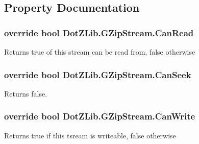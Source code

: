 \subsection{Property Documentation}
\hypertarget{class_dot_z_lib_1_1_g_zip_stream_a3536d9e36bb8811093a13ba973c61cd8}{
\subsubsection[{Can\+Read}]{\setlength{\rightskip}{0pt plus 5cm}override bool Dot\+Z\+Lib.\+G\+Zip\+Stream.\+Can\+Read\hspace{0.3cm}{\ttfamily [get]}}}\label{class_dot_z_lib_1_1_g_zip_stream_a3536d9e36bb8811093a13ba973c61cd8}


Returns true of this stream can be read from, false otherwise 

\hypertarget{class_dot_z_lib_1_1_g_zip_stream_a396f276d432f570ef48c0d7a56484dad}{
\subsubsection[{Can\+Seek}]{\setlength{\rightskip}{0pt plus 5cm}override bool Dot\+Z\+Lib.\+G\+Zip\+Stream.\+Can\+Seek\hspace{0.3cm}{\ttfamily [get]}}}\label{class_dot_z_lib_1_1_g_zip_stream_a396f276d432f570ef48c0d7a56484dad}


Returns false. 

\hypertarget{class_dot_z_lib_1_1_g_zip_stream_ac92913dd8e3dc75618073ec5b98ec739}{
\subsubsection[{Can\+Write}]{\setlength{\rightskip}{0pt plus 5cm}override bool Dot\+Z\+Lib.\+G\+Zip\+Stream.\+Can\+Write\hspace{0.3cm}{\ttfamily [get]}}}\label{class_dot_z_lib_1_1_g_zip_stream_ac92913dd8e3dc75618073ec5b98ec739}


Returns true if this tsream is writeable, false otherwise 

